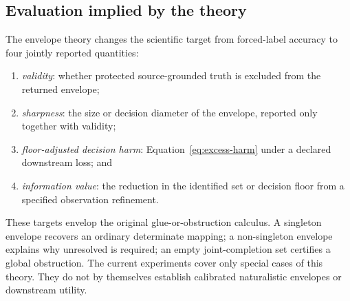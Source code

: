 \subsection{Evaluation implied by the theory}

The envelope theory changes the scientific target from forced-label accuracy
to four jointly reported quantities:
\begin{enumerate}
  \item \emph{validity}: whether protected source-grounded truth is excluded
        from the returned envelope;
  \item \emph{sharpness}: the size or decision diameter of the envelope,
        reported only together with validity;
  \item \emph{floor-adjusted decision harm}: Equation~\eqref{eq:excess-harm}
        under a declared downstream loss; and
  \item \emph{information value}: the reduction in the identified set or
        decision floor from a specified observation refinement.
\end{enumerate}
These targets envelop the original glue-or-obstruction calculus. A singleton
envelope recovers an ordinary determinate mapping; a non-singleton envelope
explains why unresolved is required; an empty joint-completion set certifies a
global obstruction. The current experiments cover only special cases of this
theory. They do not by themselves establish calibrated naturalistic envelopes
or downstream utility.

\endinput
